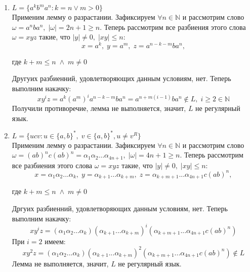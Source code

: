 \documentclass{article}
\begin{document}
\begin{enumerate}
        \item \(L = \{a^{k}b^{m}a^{n} : k = n \vee m > 0\}\)\\
        Применим лемму о разрастании. Зафиксируем \(\forall n \in \mathbb{N} \) и рассмотрим слово \(\omega = a^nba^n, \; |\omega| = 2n + 1 \geqslant n\). Теперь рассмотрим все разбиения этого слова \(\omega = xyz\) такие, что \(|y| \neq 0, \; |xy| \leq n\):
        $$x = a^{k}, \; y = a^{m}, \; z = a^{n-k-m}ba^{n},$$ 
        \begin{center}
            где \(k + m \leqslant n \; \wedge \; m \ne 0\)
        \end{center} 
        Другуих разбиенний, удовлетворяющих данным условиям, нет.
        Теперь выполним накачку: 
        $$xy^{i}z = a^{k}(a^{m})^{i}a^{n-k-m}ba^{n} = a^{n+m(i-1)}ba^{n} \notin L, \; i 
        \geqslant 2 \in \mathbb{N} $$
        Получили противоречие, лемма не выполняется, значит, \(L\) не регулярный язык.
        
        \item \(L = \{ucv : u \in \{a, b\}^*, \; v \in \{a, b\}^*, u \ne v^R \}\)\\
        Применим лемму о разрастании. Зафиксируем \(\forall n \in \mathbb{N} \) и рассмотрим слово \(\omega = (ab)^nc(ab)^n = \alpha_1\alpha_2...\alpha_{4n+1}, \; |\omega| = 4n + 1 \geqslant n\). Теперь рассмотрим все разбиения этого слова \(\omega = xyz\) такие, что \(|y| \neq 0, \; |xy| \leq n\):
        $$x = \alpha_1\alpha_2...\alpha_k, \; y = \alpha_{k+1}...\alpha_{k+m}, \; z = \alpha_{k+m+1}...\alpha_{4n+1}c(ab)^n,$$
        \begin{center}
            где \(k + m \leqslant n \; \wedge \; m \ne 0\)
        \end{center} 
        Дргуих разбиенний, удовлетворяющих данным условиям, нет. Теперь выполним накачку: 
        $$xy^{i}z = (\alpha_1\alpha_2...\alpha_k)(\alpha_{k+1}...\alpha_{k+m})^i(\alpha_{k+m+1}...\alpha_{4n+1}c(ab)^n)$$
        При \(i = 2\) имеем:
        $$xy^{2}z = (\alpha_1\alpha_2...\alpha_k)(\alpha_{k+1}...\alpha_{k+m})^2(\alpha_{k+m+1}...\alpha_{4n+1}c(ab)^n) \notin L$$
        Лемма не выполняется, значит, \(L\) не регулярный язык.
    \end{enumerate}
\end{document}
